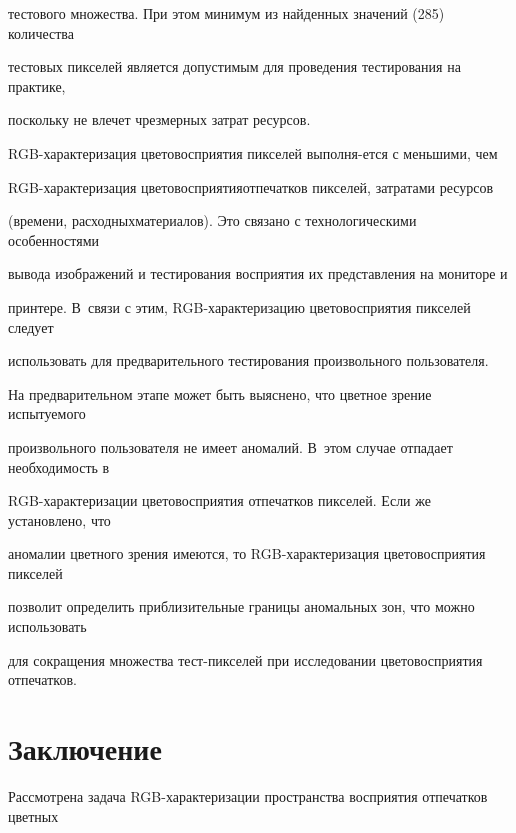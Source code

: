 тестового множества. При этом минимум из найденных значений (285) количества


тестовых пикселей является допустимым для проведения тестирования на практике,


поскольку не влечет чрезмерных затрат ресурсов.





RGB-характеризация цветовосприятия пикселей выполня-\linebreak ется с меньшими, чем


RGB-характеризация цветовосприятия\linebreak отпечатков пикселей, затратами ресурсов


(времени, расходных\linebreak материалов). Это связано с технологическими особенностями\linebreak


вывода изображений и тестирования восприятия их представления на мониторе и


принтере. В~связи с этим, RGB-ха\-рак\-те\-ри\-за\-цию цветовосприятия пикселей следует


использовать для предварительного тестирования произвольного пользователя.





На предварительном этапе может быть выяснено, что цветное зрение испытуемого


произвольного пользователя не имеет аномалий. В~этом случае отпадает необходимость в


RGB-ха\-рак\-те\-ри\-за\-ции цветовосприятия отпечатков пикселей. Если же установлено, что


аномалии цветного зрения имеются, то RGB-характеризация цветовосприятия пикселей


позволит определить приблизительные границы аномальных зон, что можно использовать


для сокращения множества тест-пикселей при исследовании цветовосприятия отпечатков.





\section{Заключение}





Рассмотрена задача RGB-характеризации пространства восприятия отпечатков цветных


